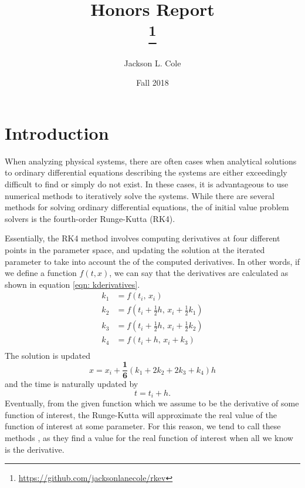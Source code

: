 \documentclass[onecolumn,titlepage,letterpaper,10pt]{article}
\title{Honors Report\\
\large \theWorkingTitle\thanks{\url{https://github.com/jacksonlanecole/rkev}}}
\author{Jackson L. Cole}
\affil{Department of Physics and Astronomy, Middle Tennessee State University}
\date{Fall 2018}
\newcommand{\functionof}[2]{#1\left(#2\right)}
\newcommand{\paren}[1]{\left(#1\right)}
\begin{document}

\maketitle
\tableofcontents
\listoffigures
\doublespacing

\section{Introduction}
When analyzing physical systems, there are often cases when analytical
solutions to ordinary differential equations describing the systems
are either exceedingly difficult to find or simply do not exist.
In these cases, it is advantageous to use numerical methods to
iteratively solve the systems. While there are several methods for solving ordinary
differential equations, the  of initial value problem solvers is
the fourth-order Runge-Kutta (RK4). \cite{holmes_2018}

Essentially, the RK4 method involves computing derivatives at
four different points in the parameter space, and updating the solution at the
iterated parameter to take into account the 
of the computed
derivatives. In other words, if we define a function $\functionof{f}{t, x}$, we
can say that the derivatives are calculated as shown in equation \eqref{eqn:
kderivatives}.
\begin{equation}
\begin{aligned}
    k_1 &= \functionof{f}{t_i,\, x_i}\\
    k_2 &= \functionof{f}{t_i + \frac{1}{2}h,\, x_i + \frac{1}{2}k_1}\\
    k_3 &= \functionof{f}{t_i + \frac{1}{2}h,\, x_i + \frac{1}{2}k_2}\\
    k_4 &= \functionof{f}{       t_i + h,\,        x_i + k_3}\\
    \label{eqn: kderivatives}
\end{aligned}
\end{equation}
The solution is updated
\begin{equation}
    x   = x_i + \mathbf{\frac{1}{6}}\paren{k_1 + 2k_2 + 2k_3 + k_4}h
\end{equation}
and the time is naturally updated by
\begin{equation}
    \label{eqn: time update}
    t = t_i + h.
\end{equation}
Eventually, from the given function which we assume to be the derivative of some
function of interest, the Runge-Kutta will approximate the real value of the
function of interest at some parameter. For this reason, we tend to call these
methods , as they find a value for the real function of
interest when all we know is the derivative.
\end{document}
